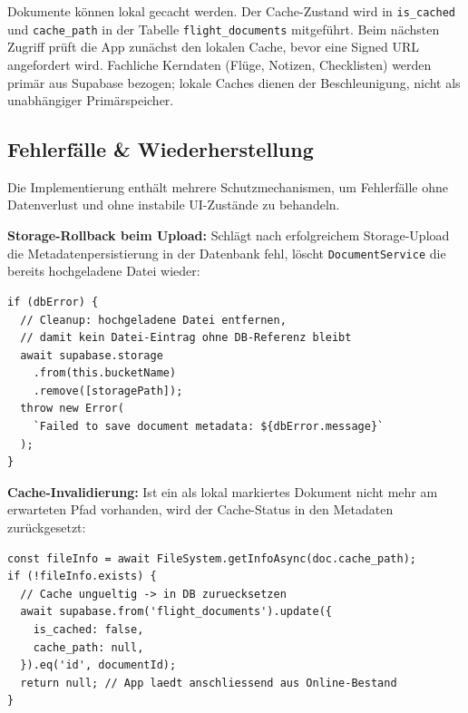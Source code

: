 Dokumente können lokal gecacht werden.
Der Cache-Zustand wird in \texttt{is\_cached} und \texttt{cache\_path} in der Tabelle
\texttt{flight\_documents} mitgeführt.
Beim nächsten Zugriff prüft die App zunächst den lokalen Cache, bevor eine Signed URL
angefordert wird.
Fachliche Kerndaten (Flüge, Notizen, Checklisten) werden primär aus Supabase bezogen;
lokale Caches dienen der Beschleunigung, nicht als unabhängiger Primärspeicher.

\subsection{Fehlerfälle \& Wiederherstellung}

Die Implementierung enthält mehrere Schutzmechanismen, um Fehlerfälle ohne Datenverlust
und ohne instabile UI-Zustände zu behandeln.

\textbf{Storage-Rollback beim Upload:}
Schlägt nach erfolgreichem Storage-Upload die Metadatenpersistierung in der Datenbank fehl,
löscht \texttt{DocumentService} die bereits hochgeladene Datei wieder:

\begin{lstlisting}[style=skyline-ts,
  caption={Storage-Rollback bei DB-Fehler (services/documentService.ts)},
  label={lst:rollback}]
if (dbError) {
  // Cleanup: hochgeladene Datei entfernen,
  // damit kein Datei-Eintrag ohne DB-Referenz bleibt
  await supabase.storage
    .from(this.bucketName)
    .remove([storagePath]);
  throw new Error(
    `Failed to save document metadata: ${dbError.message}`
  );
}
\end{lstlisting}

\textbf{Cache-Invalidierung:}
Ist ein als lokal markiertes Dokument nicht mehr am erwarteten Pfad vorhanden,
wird der Cache-Status in den Metadaten zurückgesetzt:

\begin{lstlisting}[style=skyline-ts,
  caption={Cache-Validierung und -Reset (services/documentService.ts)},
  label={lst:cache_invalidate}]
const fileInfo = await FileSystem.getInfoAsync(doc.cache_path);
if (!fileInfo.exists) {
  // Cache ungueltig -> in DB zuruecksetzen
  await supabase.from('flight_documents').update({
    is_cached: false,
    cache_path: null,
  }).eq('id', documentId);
  return null; // App laedt anschliessend aus Online-Bestand
}
\end{lstlisting}

